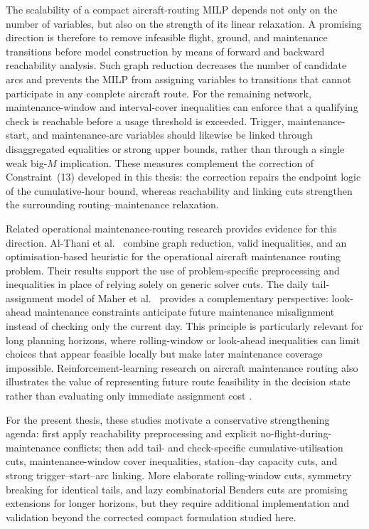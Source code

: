 The scalability of a compact aircraft-routing MILP depends not only on the
number of variables, but also on the strength of its linear relaxation. A
promising direction is therefore to remove infeasible flight, ground, and
maintenance transitions before model construction by means of forward and
backward reachability analysis. Such graph reduction decreases the number of
candidate arcs and prevents the MILP from assigning variables to transitions
that cannot participate in any complete aircraft route. For the remaining
network, maintenance-window and interval-cover inequalities can enforce that a
qualifying check is reachable before a usage threshold is exceeded. Trigger,
maintenance-start, and maintenance-arc variables should likewise be linked
through disaggregated equalities or strong upper bounds, rather than through a
single weak big-$M$ implication. These measures complement the correction of
Constraint~(13) developed in this thesis: the correction repairs the endpoint
logic of the cumulative-hour bound, whereas reachability and linking cuts
strengthen the surrounding routing--maintenance relaxation.

Related operational maintenance-routing research provides evidence for this
direction. Al-Thani et al.~\citep{althani2016oamrp} combine graph reduction,
valid inequalities, and an optimisation-based heuristic for the operational
aircraft maintenance routing problem. Their results support the use of
problem-specific preprocessing and inequalities in place of relying solely on
generic solver cuts. The daily tail-assignment model of Maher et
al.~\citep{maher2018daily} provides a complementary perspective: look-ahead
maintenance constraints anticipate future maintenance misalignment instead of
checking only the current day. This principle is particularly relevant for
long planning horizons, where rolling-window or look-ahead inequalities can
limit choices that appear feasible locally but make later maintenance coverage
impossible. Reinforcement-learning research on aircraft maintenance routing
also illustrates the value of representing future route feasibility in the
decision state rather than evaluating only immediate assignment cost
\citep{ruan2021reinforcement}.

For the present thesis, these studies motivate a conservative strengthening
agenda: first apply reachability preprocessing and explicit no-flight-during-
maintenance conflicts; then add tail- and check-specific cumulative-utilisation
cuts, maintenance-window cover inequalities, station--day capacity cuts, and
strong trigger--start--arc linking. More elaborate rolling-window cuts,
symmetry breaking for identical tails, and lazy combinatorial Benders cuts are
promising extensions for longer horizons, but they require additional
implementation and validation beyond the corrected compact formulation studied
here.


